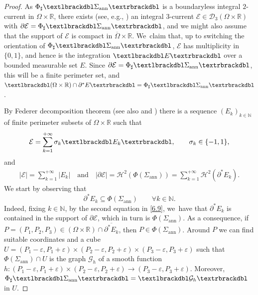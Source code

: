 \documentclass[11pt]{article}
\numberwithin{equation}{section}
\newcommand{\R}{\mathbb{R}}
\let\eps\varepsilon
\let\Om\Omega
\newcommand{\jump}[1]{\textup{\textlbrackdbl}{#1}\textup{\textrbrackdbl}}
\newcommand{\openannulus}{\Sigma_\mathrm{ann}}
\theoremstyle{definition}
\begin{document}
\begin{proof}
As $\Phi_\sharp\jump{\openannulus}$ is a boundaryless integral $2$-current in $\Omega\times\R$, there exists (see, e.g., \cite[Th.\,7.9.1]{Krantz-Parks}) an integral $3$-current $\mathcal E\in \mathcal D_3(\Omega\times\R)$ with $\partial\mathcal E=\Phi_\sharp\jump{\openannulus}$, and we might also assume that the support of $\mathcal E$ is compact in $\overline\Omega\times\R$. We~claim that, up to switching the orientation of $\Phi_\sharp\jump{\openannulus}$, $\mathcal E$ has multiplicity in $\{0,1\}$, and hence is the integration $\jump{E}$ over a bounded measurable set $E$.
Since $\partial\mathcal E=\Phi_\sharp\jump{\openannulus}$, this will be a
finite perimeter set, and $\jump{(\Om\times\R)\cap\partial^*E}=\Phi_\sharp\jump{\openannulus}$.

By Federer decomposition theorem \cite[\S 4.2.25, p.\,420]{Federer} (see also \cite[\S 4.5.9]{Federer} and \cite[Th.\,7.5.5]{Krantz-Parks}) there is a sequence
$(E_k)_{k\in \mathbb N}$ of finite perimeter subsets of $\Om\times\R$ such that
\begin{equation}\label{6.9a}
\mathcal E=\sum_{k=1}^{+\infty}\sigma_k\jump{E_k},\qquad \sigma_k\in \{-1,1\},
\end{equation}
and
\begin{align}\label{6.9}
|\mathcal E|=\sum_{k=1}^{+\infty}|E_k|\quad\text{and} \quad|\partial\mathcal E|=\mathcal H^2(\Phi(\openannulus))=\sum_{k=1}^{+\infty}\mathcal H^2(\partial^*E_k).
\end{align}
We start by observing that
\begin{equation}\label{inclusione}
\partial^*E_k\subseteq \Phi(\openannulus)\qquad \forall k\in \mathbb N.
\end{equation}
Indeed, fixing $k\in \mathbb N$, by the second equation in \eqref{6.9}, we~have that $\partial^*E_k$ is contained in the support of $\partial\mathcal E$, which in turn is $\Phi(\openannulus)$.
As a consequence, if $P=(P_1,P_2,P_3)\in(\Om\times\R)\cap \overline{\partial^*E_k}$, then $P\in \Phi(\openannulus)$. Around $P$ we can find suitable coordinates and a cube $U=(P_1-\eps,P_1+\eps)\times (P_2-\eps,P_2+\eps)\times(P_3-\eps,P_3+\eps)$ such that $\Phi(\openannulus)\cap U$ is the graph $\mathcal G_h$ of a smooth function $h:(P_1-\eps,P_1+\eps)\times (P_2-\eps,P_2+\eps)\to (P_3-\eps,P_3+\eps)$. Moreover, $\Phi_\sharp\jump{\openannulus}=\jump{\mathcal G_h}$ in $U$.


\end{proof}
\end{document}
